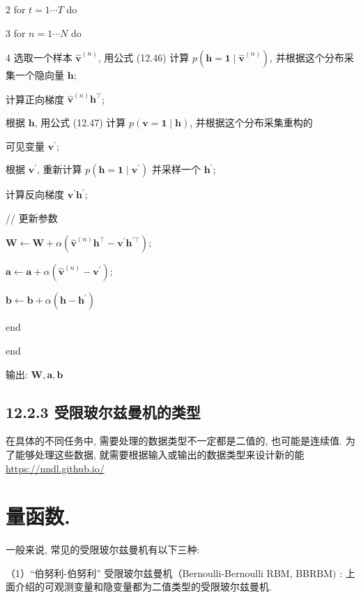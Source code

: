 \documentclass[10pt]{article}
\begin{document}
2 for $t=1 \cdots T$ do

3 for $n=1 \cdots N$ do

4 选取一个样本 $\hat{\boldsymbol{v}}^{(n)}$, 用公式 (12.46) 计算 $p\left(\boldsymbol{h}=\mathbf{1} \mid \hat{\boldsymbol{v}}^{(n)}\right)$, 并根据这个分布采集一个隐向量 $\boldsymbol{h} ;$

计算正向梯度 $\hat{\boldsymbol{v}}^{(n)} \boldsymbol{h}^{\top}$;

根据 $\boldsymbol{h}$, 用公式 (12.47) 计算 $p(\boldsymbol{v}=\mathbf{1} \mid \boldsymbol{h})$, 并根据这个分布采集重构的

可见变量 $\boldsymbol{v}^{\prime}$;

根据 $\boldsymbol{v}^{\prime}$, 重新计算 $p\left(\boldsymbol{h}=\mathbf{1} \mid \boldsymbol{v}^{\prime}\right)$ 并采样一个 $\boldsymbol{h}^{\prime}$;

计算反向梯度 $\boldsymbol{v}^{\prime} \boldsymbol{h}^{\prime}$;

// 更新参数

$\boldsymbol{W} \leftarrow \boldsymbol{W}+\alpha\left(\hat{\boldsymbol{v}}^{(n)} \boldsymbol{h}^{\top}-\boldsymbol{v}^{\prime} \boldsymbol{h}^{\prime \top}\right) ;$

$\boldsymbol{a} \leftarrow \boldsymbol{a}+\alpha\left(\hat{\boldsymbol{v}}^{(n)}-\boldsymbol{v}^{\prime}\right) ;$

$\boldsymbol{b} \leftarrow \boldsymbol{b}+\alpha\left(\boldsymbol{h}-\boldsymbol{h}^{\prime}\right)$

end

end

输出: $\boldsymbol{W}, \boldsymbol{a}, \boldsymbol{b}$

\subsection*{12.2.3 受限玻尔兹曼机的类型}
在具体的不同任务中, 需要处理的数据类型不一定都是二值的, 也可能是连续值. 为了能够处理这些数据, 就需要根据输入或输出的数据类型来设计新的能 \href{https://nndl.github.io/}{https://nndl.github.io/}

\section*{量函数.}
一般来说, 常见的受限玻尔兹曼机有以下三种:

（1）“伯努利-伯努利” 受限玻尔兹曼机（Bernoulli-Bernoulli RBM, BB$\mathrm{RBM})$ : 上面介绍的可观测变量和隐变量都为二值类型的受限玻尔兹曼机.
\end{document}
